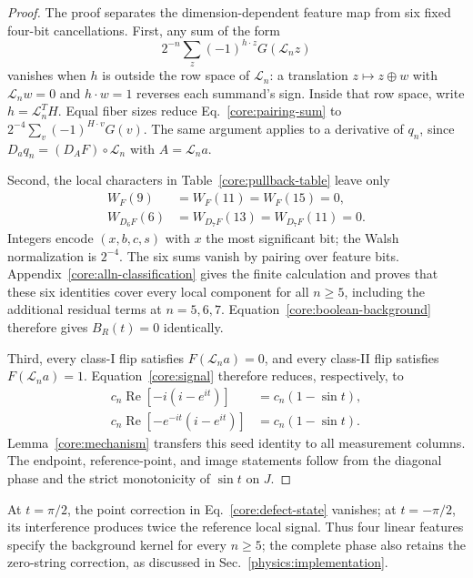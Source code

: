 \begin{proof}
The proof separates the dimension-dependent feature map from six fixed four-bit cancellations. First, any sum of the form
\begin{equation}
 2^{-n}\sum_z(-1)^{h\cdot z}G(\mathcal L_nz)
 \label{core:pairing-sum}
\end{equation}
vanishes when $h$ is outside the row space of $\mathcal L_n$: a translation $z\mapsto z\oplus w$ with $\mathcal L_nw=0$ and $h\cdot w=1$ reverses each summand's sign. Inside that row space, write $h=\mathcal L_n^TH$. Equal fiber sizes reduce Eq.~\eqref{core:pairing-sum} to $2^{-4}\sum_v(-1)^{H\cdot v}G(v)$. The same argument applies to a derivative of $q_n$, since $D_aq_n=(D_AF)\circ\mathcal L_n$ with $A=\mathcal L_na$.

Second, the local characters in Table~\ref{core:pullback-table} leave only
\begin{align}
 W_F(9)&=W_F(11)=W_F(15)=0,\nonumber\\
 W_{D_6F}(6)&=W_{D_7F}(13)=W_{D_7F}(11)=0.
 \label{core:six-cancellations}
\end{align}
Integers encode $(x,b,c,s)$ with $x$ the most significant bit; the Walsh normalization is $2^{-4}$. The six sums vanish by pairing over feature bits. Appendix~\ref{core:alln-classification} gives the finite calculation and proves that these six identities cover every local component for all $n\ge5$, including the additional residual terms at $n=5,6,7$. Equation~\eqref{core:boolean-background} therefore gives $B_R(t)=0$ identically.

Third, every class-I flip satisfies $F(\mathcal L_na)=0$, and every class-II flip satisfies $F(\mathcal L_na)=1$. Equation~\eqref{core:signal} therefore reduces, respectively, to
\begin{align}
 c_n\operatorname{Re}[-i(i-e^{it})]&=c_n(1-\sin t),\nonumber\\
 c_n\operatorname{Re}[-e^{-it}(i-e^{it})]&=c_n(1-\sin t).
\end{align}
Lemma~\ref{core:mechanism} transfers this seed identity to all measurement columns. The endpoint, reference-point, and image statements follow from the diagonal phase and the strict monotonicity of $\sin t$ on $J$.
\end{proof}

At $t=\pi/2$, the point correction in Eq.~\eqref{core:defect-state} vanishes; at $t=-\pi/2$, its interference produces twice the reference local signal. Thus four linear features specify the background kernel for every $n\ge5$; the complete phase also retains the zero-string correction, as discussed in Sec.~\ref{physics:implementation}.

